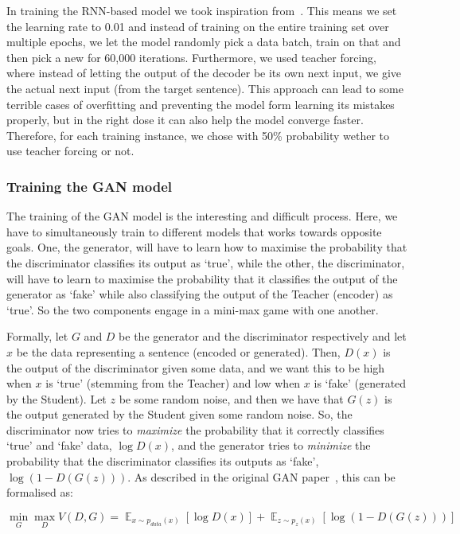 \documentclass{article}
\DeclareMathOperator*{\E}{\mathbb{E}}
\begin{document}
In training the RNN-based model we took inspiration
from~\cite{pytorchTutorialAtt}. This means we set the learning rate to 0.01 and
instead of training on the entire training set over multiple epochs, we let the
model randomly pick a data batch, train on that and then pick a new for 60,000
iterations. Furthermore, we used teacher forcing, where instead of letting the
output of the decoder be its own next input, we give the actual next input (from
the target sentence). This approach can lead to some terrible cases of
overfitting and preventing the model form learning its mistakes properly, but in
the right dose it can also help the model converge faster. Therefore, for each
training instance, we chose with 50\% probability wether to use teacher forcing
or not.


\subsubsection{Training the GAN model}

The training of the GAN model is the interesting and difficult process. Here, we
have to simultaneously train to different models that works towards opposite
goals. One, the generator, will have to learn how to maximise the probability
that the discriminator classifies its output as `true', while the other, the
discriminator, will have to learn to maximise the probability that it classifies
the output of the generator as `fake' while also classifying the output of the
Teacher (encoder) as `true'. So the two components engage in a mini-max game
with one another.

Formally, let $G$ and $D$ be the generator and the discriminator respectively
and let $x$ be the data representing a sentence (encoded or generated). Then,
$D(x)$ is the output of the discriminator given some data, and we want this to
be high when $x$ is `true' (stemming from the Teacher) and low when $x$ is
`fake' (generated by the Student). Let $z$ be some random noise, and then we
have that $G(z)$ is the output generated by the Student given some random noise.
So, the discriminator now tries to \textit{maximize} the probability that it
correctly classifies `true' and `fake' data, $\log D(x)$, and the generator
tries to \textit{minimize} the probability that the discriminator classifies its
outputs as `fake', $\log(1 - D(G(z)))$. As described in the original GAN
paper~\cite{Goodfellow2014GenerativeAN}, this can be formalised as:

\[
    \min_G \max_D V(D,G) = {\E}_{x \sim p_{data}(x)}\left[\log D(x)\right] +
        {\E}_{z \sim p_{z}(x)}\left[\log(1 - D(G(z)))\right]
\] 
\end{document}
